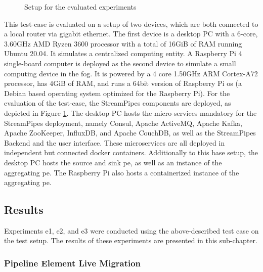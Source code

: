 \begin{figure}[!ht]
    \centering
    \graphicspath{{./figures/code/}}
    
    \caption{Setup for the evaluated experiments}
    \label{fEvaluationSetup}
\end{figure}


This test-case is evaluated on a setup of two devices, which are both connected to a local router via gigabit ethernet. The first device is a desktop PC with a 6-core, 3.60GHz AMD Ryzen 3600 processor with a total of 16GiB of RAM running Ubuntu 20.04. It simulates a centralized computing entity. A Raspberry Pi 4 single-board computer is deployed as the second device to simulate a small computing device in the fog. It is powered by a 4 core 1.50GHz ARM Cortex-A72 processor, has 4GiB of RAM, and runs a 64bit version of Raspberry Pi \gls{os} (a Debian based operating system optimized for the Raspberry Pi). For the evaluation of the test-case, the StreamPipes components are deployed, as depicted in Figure \ref{fEvaluationSetup}. The desktop PC hosts the micro-services mandatory for the StreamPipes deployment, namely Consul, Apache ActiveMQ, Apache Kafka, Apache ZooKeeper, InfluxDB, and Apache CouchDB, as well as the StreamPipes Backend and the user interface. These microservices are all deployed in independent but connected docker containers. Additionally to this base setup, the desktop PC hosts the source and sink \gls{pe}, as well as an instance of the aggregating \gls{pe}. The Raspberry Pi also hosts a containerized instance of the aggregating \gls{pe}.

\subsection{Results}
\label{lEvaluationResults}

Experiments \acrshort{e}1, \acrshort{e}2, and \acrshort{e}3 were conducted using the above-described test case on the test setup. The results of these experiments are presented in this sub-chapter.



\subsubsection{Pipeline Element Live Migration}
\label{lResultsOperatorStateMigration}

